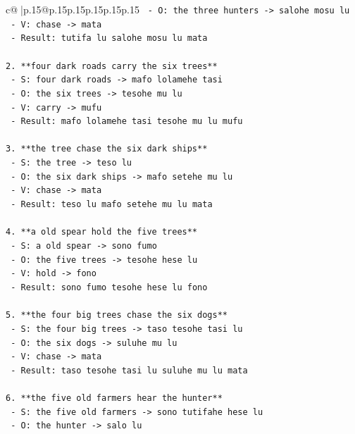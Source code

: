 \documentclass{article}
\begin{document}
{\begin{supertabular}{c@{$\;$}|p{.15\linewidth}@{}p{.15\linewidth}p{.15\linewidth}p{.15\linewidth}p{.15\linewidth}p{.15\linewidth}}
{{{\texttt{   {-} O: the three hunters {-}> salohe mosu lu} \\
\texttt{   {-} V: chase {-}> mata} \\
\texttt{   {-} Result: tutifa lu salohe mosu lu mata} \\
\\ 
\texttt{2. **four dark roads carry the six trees**} \\
\texttt{   {-} S: four dark roads {-}> mafo lolamehe tasi} \\
\texttt{   {-} O: the six trees {-}> tesohe mu lu} \\
\texttt{   {-} V: carry {-}> mufu} \\
\texttt{   {-} Result: mafo lolamehe tasi tesohe mu lu mufu} \\
\\ 
\texttt{3. **the tree chase the six dark ships**} \\
\texttt{   {-} S: the tree {-}> teso lu} \\
\texttt{   {-} O: the six dark ships {-}> mafo setehe mu lu} \\
\texttt{   {-} V: chase {-}> mata} \\
\texttt{   {-} Result: teso lu mafo setehe mu lu mata} \\
\\ 
\texttt{4. **a old spear hold the five trees**} \\
\texttt{   {-} S: a old spear {-}> sono fumo} \\
\texttt{   {-} O: the five trees {-}> tesohe hese lu} \\
\texttt{   {-} V: hold {-}> fono} \\
\texttt{   {-} Result: sono fumo tesohe hese lu fono} \\
\\ 
\texttt{5. **the four big trees chase the six dogs**} \\
\texttt{   {-} S: the four big trees {-}> taso tesohe tasi lu} \\
\texttt{   {-} O: the six dogs {-}> suluhe mu lu} \\
\texttt{   {-} V: chase {-}> mata} \\
\texttt{   {-} Result: taso tesohe tasi lu suluhe mu lu mata} \\
\\ 
\texttt{6. **the five old farmers hear the hunter**} \\
\texttt{   {-} S: the five old farmers {-}> sono tutifahe hese lu} \\
\texttt{   {-} O: the hunter {-}> salo lu} \\
}}}
\end{supertabular}}
\end{document}
